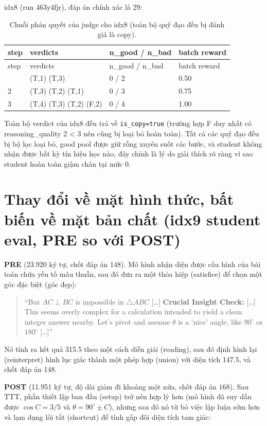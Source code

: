 idx8 (run 463y4fjr), đáp án chính xác là 29:

\begin{longtable}{llll}
\caption{Chuỗi phán quyết của judge cho idx8 (toàn bộ quỹ đạo đều bị đánh giá là copy).}\\
\toprule
step & verdicts & n\_good / n\_bad & batch reward \\
\midrule
\endfirsthead
\toprule
step & verdicts & n\_good / n\_bad & batch reward \\
\midrule
\endhead
\bottomrule
\endfoot
1 & (T,1) (T,3) & 0 / 2 & 0.50 \\
2 & (T,3) (T,2) (T,1) & 0 / 3 & 0.75 \\
3 & (T,4) (T,3) (T,2) (F,2) & 0 / 4 & 1.00 \\
\end{longtable}

Toàn bộ verdict của idx8 đều trả về \texttt{is\_copy=true} (trường hợp F duy nhất có reasoning\_quality 2 \textless{} 3 nên cũng bị loại bỏ hoàn toàn). Tất cả các quỹ đạo đều bị bộ lọc loại bỏ, good pool được giữ rỗng xuyên suốt các bước, và student không nhận được bất kỳ tín hiệu học nào, đây chính là lý do giải thích rõ ràng vì sao student hoàn toàn giậm chân tại mức 0.

\section{Thay đổi về mặt hình thức, bất biến về mặt bản chất (idx9 student eval, PRE so với POST)}\label{d.3-form-changes-substance-does-not-idx9-student-eval-pre-vs-post}

\textbf{PRE} (23.920 ký tự, chốt đáp án \(\boxed{148}\)). Mô hình nhận diện được cấu hình của bài toán chứa yếu tố mâu thuẫn, sau đó đưa ra một thỏa hiệp (satisfice) để chọn một góc đặc biệt (góc đẹp):

\begin{quote}
``But \(AC \perp BC\) is impossible in \(\triangle ABC\) {[\ldots]} \textbf{Crucial Insight Check:} {[\ldots]} This seems overly complex for a calculation intended to yield a clean integer answer nearby. Let's pivot and assume \(\theta\) is a `nice' angle, like \(90^\circ\) or \(180^\circ\) {[\ldots]}''
\end{quote}

Nó tính ra kết quả 315.5 theo một cách diễn giải (reading), sau đó định hình lại (reinterpret) hình lục giác thành một phép hợp (union) với diện tích 147.5, và chốt đáp án 148.

\textbf{POST} (11.951 ký tự, độ dài giảm đi khoảng một nửa, chốt đáp án \(\boxed{168}\)). Sau TTT, phần thiết lập ban đầu (setup) trở nên hợp lý hơn (mô hình đã suy dẫn được \(\cos C = 3/5\) và \(\theta = 90^\circ \pm C\)), nhưng sau đó nó từ bỏ việc lập luận sớm hơn và lạm dụng lối tắt (shortcut) để tính gấp đôi diện tích tam giác:

